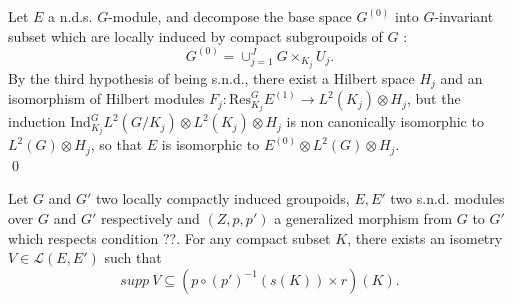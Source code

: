 \begin{dem}
Let $E$ a n.d.s. $G$-module, and decompose the base space $G^{(0)}$ into $G$-invariant subset which are locally induced by compact subgroupoids of $G$ :
\[G^{(0)} = \cup_{j=1}^J G\times_{K_j} U_j.\]
By the third hypothesis of being s.n.d., there exist a Hilbert space $H_j$ and an isomorphism of Hilbert modules $F_j :\text{Res}_{K_j}^G E^{(1)} \rightarrow  L^2(K_j)\otimes H_j$, but the induction $\text{Ind}_{K_j}^G L^2(G/K_j)\otimes L^2(K_j)\otimes H_j$ is non canonically isomorphic to $L^2(G)\otimes H_j$, so that $E$ is isomorphic to $E^{(0)}\otimes L^2(G)\otimes H_j$.\\
\qed
\end{dem}

\begin{cor}
Let $G$ and $G'$ two locally compactly induced groupoids, $E,E'$ two s.n.d. modules over $G$ and $G'$ respectively and $(Z,p,p')$ a generalized morphism from $G$ to $G'$ which respects condition ??. For any compact subset $K$, there exists an isometry $V\in \mathcal L(E,E')$ such that
\[supp\ V \subseteq (p\circ (p')^{-1}(s(K))\times r)(K). \]
\end{cor}
























 


